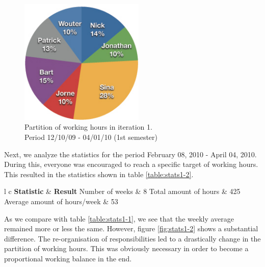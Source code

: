 \documentclass[salesmen, twoside]{../../../templates/latex/2009/softproj}
\begin{document}
\begin{projdoc}
			\begin{figure}
				\begin{center}
				\includegraphics[height=6cm]{../../img/partition-1iter-1sem.jpg}
				\caption{Partition of working hours in iteration 1. \\ Period 12/10/09 - 04/01/10 (1st semester)}
				\label{fig:stats1-1}
				\end{center}
			\end{figure}
	
			Next, we analyze the statistics for the period February 08, 2010 - April 04, 2010. During this,
			everyone was encouraged to reach a specific target of working hours. This resulted in the statistics
			shown in table \ref{table:stats1-2}. \\
			
			\begin{table}
				\begin{center}
			\begin{tabular}{l c}
				\FL \textbf{Statistic} & \textbf{Result}
				\ML Number of weeks & 8
				\NN Total amount of hours  & 425
				\NN Average amount of hours/week & 53
			\end{tabular}
			\caption{General statistics for period 08/02/10 - 04/04/10.}
			\label{table:stats1-2}
			\end{center}
			\end{table}
			
			As we compare with table \ref{table:stats1-1}, we see that the weekly average remained more or less the same.
			However, figure \ref{fig:stats1-2} shows a substantial difference.  
			The re-organisation of responsibilities led to a drastically change in the partition of working hours. 
			This was obviously necessary in order to
			become a proportional working balance in the end. \\
			

\end{projdoc}
\end{document}
